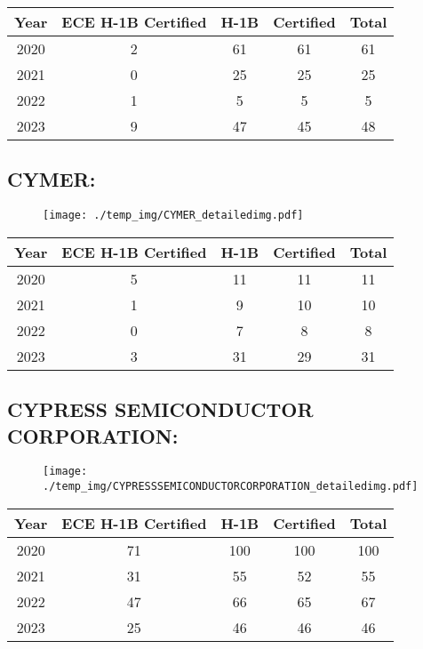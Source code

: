 \documentclass{article}%
\begin{document}
%
\begin{longtable}{c|c|c|c|c}%
\hline%
Year&ECE H{-}1B Certified&H{-}1B&Certified&Total\\%
\hline%
2020&2&61&61&61\\%
\hline%
2021&0&25&25&25\\%
\hline%
2022&1&5&5&5\\%
\hline%
2023&9&47&45&48\\%
\hline%
\end{longtable}

%
\newpage%
\subsection{CYMER:}%
\label{subsec:CYMER}%
\label{CYMERdetailed}%


\begin{figure}[htbp]%
\centering%
\texttt{[image: ./temp\_img/CYMER\_detailedimg.pdf]}%
\end{figure}

%
\begin{longtable}{c|c|c|c|c}%
\hline%
Year&ECE H{-}1B Certified&H{-}1B&Certified&Total\\%
\hline%
2020&5&11&11&11\\%
\hline%
2021&1&9&10&10\\%
\hline%
2022&0&7&8&8\\%
\hline%
2023&3&31&29&31\\%
\hline%
\end{longtable}

%
\newpage%
\subsection{CYPRESS SEMICONDUCTOR CORPORATION:}%
\label{subsec:CYPRESSSEMICONDUCTORCORPORATION}%
\label{CYPRESSSEMICONDUCTORCORPORATIONdetailed}%


\begin{figure}[htbp]%
\centering%
\texttt{[image: ./temp\_img/CYPRESSSEMICONDUCTORCORPORATION\_detailedimg.pdf]}%
\end{figure}

%
\begin{longtable}{c|c|c|c|c}%
\hline%
Year&ECE H{-}1B Certified&H{-}1B&Certified&Total\\%
\hline%
2020&71&100&100&100\\%
\hline%
2021&31&55&52&55\\%
\hline%
2022&47&66&65&67\\%
\hline%
2023&25&46&46&46\\%
\hline%
\end{longtable}
\end{document}
